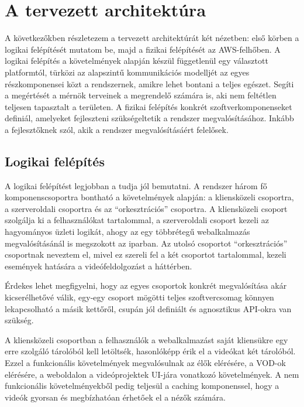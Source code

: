 \chapter{A tervezett architektúra}

A következőkben részletezem a tervezett architektúrát két nézetben: első körben a logikai felépítését mutatom be, majd a fizikai felépítését az AWS-felhőben. A logikai felépítés a követelmények alapján készül függetlenül egy választott platformtól, türközi az alapszintű kommunikációs modelljét az egyes részkomponensei közt a rendszernek, amikre lehet bontani a teljes egészet. Segíti a megértését a mérnök terveinek a megrendelő számára is, aki nem feltétlen teljesen tapasztalt a területen. A fizikai felépítés konkrét szoftverkomponenseket definiál, amelyeket fejleszteni szükségeltetik a rendszer megvalósításához. Inkább a fejlesztőknek szól, akik a rendszer megvalósításáért felelősek.

\section{Logikai felépítés}

A logikai felépítést legjobban a  tudja jól bemutatni. A rendszer három fő komponenscsoportra bontható a követelmények alapján: a kliensközeli csoportra, a szerveroldali csoportra és az ``orkesztrációs'' csoportra. A kliensközeli csoport szolgálja ki a felhasználókat tartalommal, a szerveroldali csoport kezeli az hagyományos üzleti logikát, ahogy az egy többrétegű webalkalmazás megvalósításánál is megszokott az iparban. Az utolsó csoportot ``orkesztrációs'' csoportnak neveztem el, mivel ez szereli fel a két csoportot tartalommal, kezeli események hatására a videófeldolgozást a háttérben.

Érdekes lehet megfigyelni, hogy az egyes csoportok konkrét megvalósítása akár kicserélhetővé válik, egy-egy csoport mögötti teljes szoftvercsomag könnyen lekapcsolható a másik kettőről, csupán jól definiált és agnosztikus API-okra van szükség.

A kliensközeli csoportban a felhasználók a webalkalmazást saját kliensükre egy erre szolgáló tárolóból kell letöltsék, hasonlóképp érik el a videókat két tárolóból. Ezzel a funkcionális követelmények megvalósulnak az élők elérésére, a VOD-ok elérésére, a weboldalon a videóprojektek UI-jára vonatkozó követelmények. A nem funkcionális követelményekből pedig teljesül a caching komponenssel, hogy a videók gyorsan és megbízhatóan érhetőek el a nézők számára.

